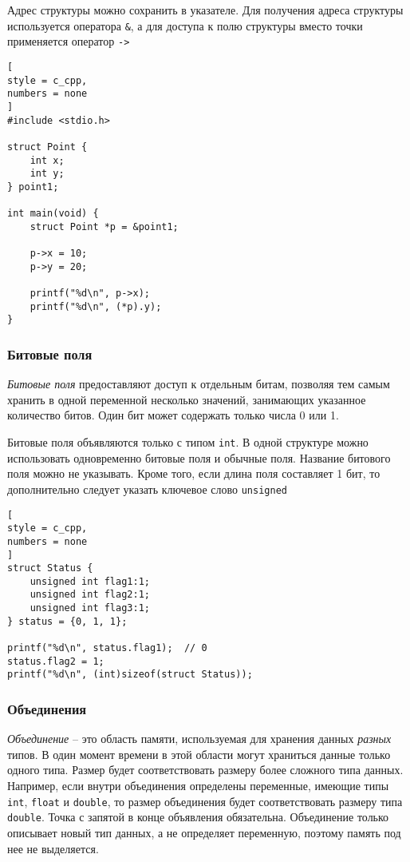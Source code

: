 \documentclass[%
	11pt,
	a4paper,
	utf8,
		]{article}
\begin{document}
Адрес структуры можно сохранить в указателе. Для получения адреса структуры используется оператора \verb*|&|, а для доступа к полю структуры вместо точки применяется оператор \verb|->|
\begin{lstlisting}[
style = c_cpp,
numbers = none
]
#include <stdio.h>

struct Point {
    int x;
    int y;
} point1;

int main(void) {
    struct Point *p = &point1;
    
    p->x = 10;
    p->y = 20;
    
    printf("%d\n", p->x);
    printf("%d\n", (*p).y);
}
\end{lstlisting}

\subsubsection{Битовые поля}

\emph{Битовые поля} предоставляют доступ к отдельным битам, позволяя тем самым хранить в одной переменной несколько значений, занимающих указанное количество битов. Один бит может содержать только числа 0 или 1.

Битовые поля объявляются только с типом \verb*|int|. В одной структуре можно использовать одновременно битовые поля и обычные поля. Название битового поля можно не указывать. Кроме того, если длина поля составляет 1 бит, то дополнительно следует указать ключевое слово \verb|unsigned|
\begin{lstlisting}[
style = c_cpp,
numbers = none
]
struct Status {
    unsigned int flag1:1;
    unsigned int flag2:1;
    unsigned int flag3:1;
} status = {0, 1, 1};

printf("%d\n", status.flag1);  // 0
status.flag2 = 1;
printf("%d\n", (int)sizeof(struct Status));
\end{lstlisting}

\subsubsection{Объединения}

\emph{Объединение} -- это область памяти, используемая для хранения данных \emph{разных} типов. В один момент времени в этой области могут храниться данные только одного типа. Размер будет соответствовать размеру более сложного типа данных. Например, если внутри объединения определены переменные, имеющие типы \verb*|int|, \verb|float| и \verb*|double|, то размер объединения будет соответствовать размеру типа \verb|double|. Точка с запятой в конце объявления обязательна. Объединение только описывает новый тип данных, а не определяет переменную, поэтому память под нее не выделяется.
\end{document}
